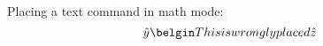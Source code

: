\documentclass{article}
\begin{document}
Placing a text command in math mode:
$$\hat{y} \belgin This is wrongly placed \hat{z}$$
\end{document}
